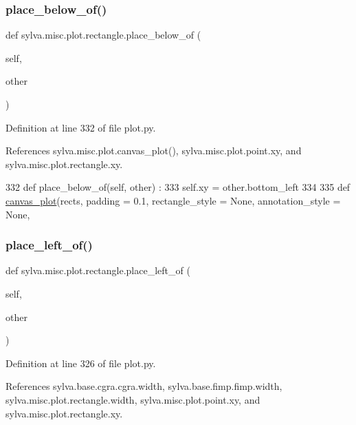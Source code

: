 \subsubsection{\texorpdfstring{place\+\_\+below\+\_\+of()}{place\_below\_of()}}
{\footnotesize\ttfamily def sylva.\+misc.\+plot.\+rectangle.\+place\+\_\+below\+\_\+of (\begin{DoxyParamCaption}\item[{}]{self,  }\item[{}]{other }\end{DoxyParamCaption})}



Definition at line 332 of file plot.\+py.



References sylva.\+misc.\+plot.\+canvas\+\_\+plot(), sylva.\+misc.\+plot.\+point.\+xy, and sylva.\+misc.\+plot.\+rectangle.\+xy.


\begin{DoxyCode}
332     \textcolor{keyword}{def }place\_below\_of(self, other) :
333       self.xy = other.bottom\_left
334 
335   \textcolor{keyword}{def }\hyperlink{namespacesylva_1_1misc_1_1plot_a405ea3f626f2fbeea085e412f742ce68}{canvas\_plot}(rects, padding = 0.1, rectangle\_style = None, annotation\_style = None,
\end{DoxyCode}
\mbox{\label{classsylva_1_1misc_1_1plot_1_1rectangle_ad468b38c9b5c95f14e5a6dec5d064cb1}} 
\subsubsection{\texorpdfstring{place\+\_\+left\+\_\+of()}{place\_left\_of()}}
{\footnotesize\ttfamily def sylva.\+misc.\+plot.\+rectangle.\+place\+\_\+left\+\_\+of (\begin{DoxyParamCaption}\item[{}]{self,  }\item[{}]{other }\end{DoxyParamCaption})}



Definition at line 326 of file plot.\+py.



References sylva.\+base.\+cgra.\+cgra.\+width, sylva.\+base.\+fimp.\+fimp.\+width, sylva.\+misc.\+plot.\+rectangle.\+width, sylva.\+misc.\+plot.\+point.\+xy, and sylva.\+misc.\+plot.\+rectangle.\+xy.


